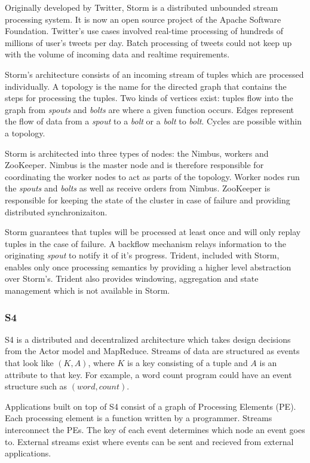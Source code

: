 \documentclass[12pt]{article}
\begin{document}
Originally developed by Twitter, Storm \cite{toshniwal2014storm} is a distributed unbounded stream processing system. It is now an open source project of the Apache Software Foundation. Twitter's use cases involved real-time processing of hundreds of millions of user's tweets per day. Batch processing of tweets could not keep up with the volume of incoming data and realtime requirements.

Storm's architecture consists of an incoming stream of tuples which are processed individually. A topology is the name for the directed graph that contains the steps for processing the tuples. Two kinds of vertices exist: tuples flow into the graph from \textit{spouts} and \textit{bolts} are where a given function occurs. Edges represent the flow of data from a \textit{spout} to a \textit{bolt} or a \textit{bolt} to \textit{bolt}. Cycles are possible within a topology.

Storm is architected into three types of nodes: the Nimbus, workers and ZooKeeper. Nimbus is the master node and is therefore responsible for coordinating the worker nodes to act as parts of the topology. Worker nodes run the \textit{spouts} and \textit{bolts} as well as receive orders from Nimbus. ZooKeeper is responsible for keeping the state of the cluster in case of failure and providing distributed synchronizaiton.

Storm guarantees that tuples will be processed at least once and will only replay tuples in the case of failure. A backflow mechanism relays information to the originating \textit{spout} to notify it of it's progress. Trident, included with Storm, enables only once processing semantics by providing a higher level abstraction over Storm's. Trident also provides windowing, aggregation and state management which is not available in Storm.



\subsubsection{S4}

S4 \cite{neumeyer2010s4} is a distributed and decentralized architecture which takes design decisions from the Actor model and MapReduce. Streams of data are structured as events that look like $(K, A)$, where $K$ is a key consisting of a tuple and $A$ is an attribute to that key. For example, a word count program could have an event structure such as $(word, count)$.

Applications built on top of S4 consist of a graph of Processing Elements (PE). Each processing element is a function written by a programmer. Streams interconnect the PEs. The key of each event determines which node an event goes to. External streams exist where events can be sent and recieved from external applications.
\end{document}
